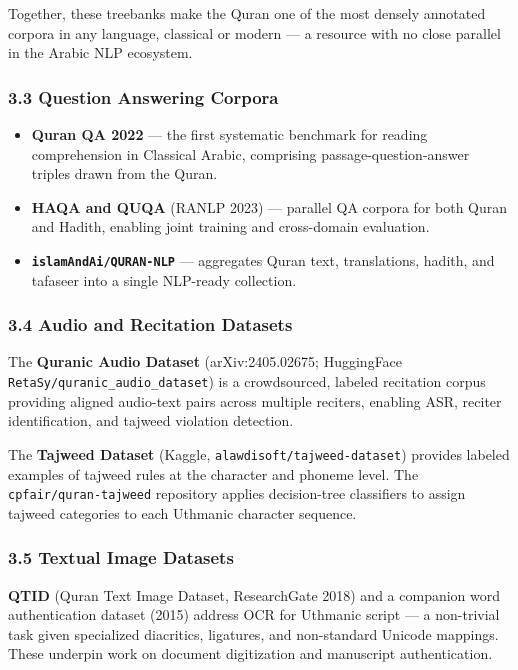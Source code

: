 \documentclass[12pt,a4paper]{article}
\providecommand{\tightlist}{\setlength{\itemsep}{0pt}\setlength{\parskip}{0pt}}
\begin{document}
Together, these treebanks make the Quran one of the most densely
annotated corpora in any language, classical or modern --- a resource
with no close parallel in the Arabic NLP ecosystem.

\subsubsection{3.3 Question Answering Corpora}\label{s3-3}

\begin{itemize}
\tightlist
\item
  \textbf{Qur\textquotesingle an QA 2022} --- the first systematic
  benchmark for reading comprehension in Classical Arabic, comprising
  passage-question-answer triples drawn from the Quran.
\item
  \textbf{HAQA and QUQA} (RANLP 2023) --- parallel QA corpora for both
  Quran and Hadith, enabling joint training and cross-domain evaluation.
\item
  \textbf{\texttt{islamAndAi/QURAN-NLP}} --- aggregates Quran text,
  translations, hadith, and tafaseer into a single NLP-ready collection.
\end{itemize}

\subsubsection{3.4 Audio and Recitation Datasets}\label{s3-4}

The \textbf{Quranic Audio Dataset} (arXiv:2405.02675; HuggingFace
\texttt{RetaSy/quranic\_audio\_dataset}) is a crowdsourced, labeled
recitation corpus providing aligned audio-text pairs across multiple
reciters, enabling ASR, reciter identification, and tajweed violation
detection.

The \textbf{Tajweed Dataset} (Kaggle,
\texttt{alawdisoft/tajweed-dataset}) provides labeled examples of
tajweed rules at the character and phoneme level. The
\texttt{cpfair/quran-tajweed} repository applies decision-tree
classifiers to assign tajweed categories to each Uthmanic character
sequence.

\subsubsection{3.5 Textual Image Datasets}\label{s3-5}

\textbf{QTID} (Quran Text Image Dataset, ResearchGate 2018) and a
companion word authentication dataset (2015) address OCR for Uthmanic
script --- a non-trivial task given specialized diacritics, ligatures,
and non-standard Unicode mappings. These underpin work on document
digitization and manuscript authentication.
\end{document}
